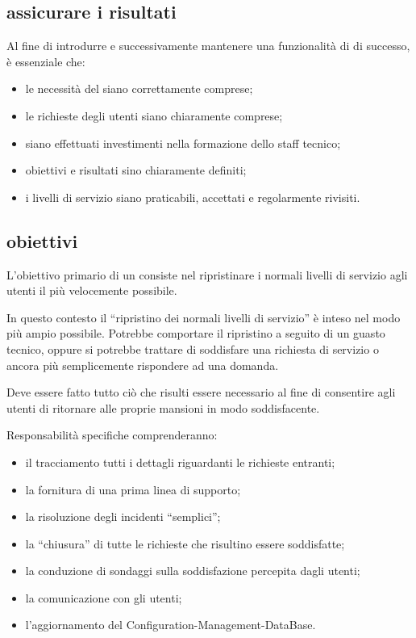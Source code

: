 \subsection[Assicurare i risultati]{assicurare i risultati}
\label{sd-ensuring-results}
Al fine di introdurre e successivamente mantenere una funzionalità di  di successo, è essenziale che:

\begin{itemize}
\item{le necessità del  siano correttamente comprese;}
\item{le richieste degli utenti siano chiaramente comprese;}
\item{siano effettuati investimenti nella formazione dello staff tecnico;}
\item{obiettivi e risultati sino chiaramente definiti;}
\item{i livelli di servizio siano praticabili, accettati e regolarmente rivisiti.}
\end{itemize}

\subsection[Obiettivi]{obiettivi}
\label{sd-objectives}
L'obiettivo primario di un  consiste nel ripristinare i normali livelli di servizio agli utenti il più velocemente possibile. 

In questo contesto il ``ripristino dei normali livelli di servizio'' è inteso nel modo più ampio possibile. Potrebbe comportare il ripristino a seguito di un guasto tecnico, oppure si potrebbe trattare di soddisfare una richiesta di servizio o ancora più semplicemente rispondere ad una domanda. 

Deve essere fatto tutto ciò che risulti essere necessario al fine di consentire agli utenti di ritornare alle proprie mansioni in modo soddisfacente.

Responsabilità specifiche comprenderanno:

\begin{itemize}
\item{il tracciamento tutti i dettagli riguardanti le richieste entranti;}
\item{la fornitura di una prima linea di supporto;}
\item{la risoluzione degli incidenti ``semplici'';}
\item{la ``chiusura'' di tutte le richieste che risultino essere soddisfatte;}
\item{la conduzione di sondaggi sulla soddisfazione percepita dagli utenti;}
\item{la comunicazione con gli utenti;}
\item{l'aggiornamento del \ac{Configuration-Management-DataBase}.}
\end{itemize}

